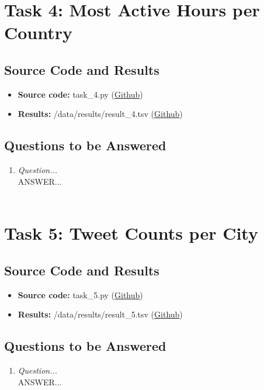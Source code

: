 \documentclass{article}
\begin{document}
\section*{Task 4: Most Active Hours per Country}
\subsection*{Source Code and Results}
    \begin{itemize}
        \item \textbf{Source code:} task\_4.py (\href{https://github.com/FredrikBakken/TDT4305_Big-Data-Project/blob/master/PhaseOne/task_4.py}{Github})
        \item \textbf{Results:} /data/results/result\_4.tsv (\href{https://github.com/FredrikBakken/TDT4305_Big-Data-Project/blob/master/PhaseOne/data/results/result_4.tsv}{Github})
    \end{itemize}

\subsection*{Questions to be Answered}
\begin{enumerate}[label=\alph*)]
    \item \textit{Question...}\\
    
    ANSWER...\\ \\
\end{enumerate}


\section*{Task 5: Tweet Counts per City}
\subsection*{Source Code and Results}
    \begin{itemize}
        \item \textbf{Source code:} task\_5.py (\href{https://github.com/FredrikBakken/TDT4305_Big-Data-Project/blob/master/PhaseOne/task_5.py}{Github})
        \item \textbf{Results:} /data/results/result\_5.tsv (\href{https://github.com/FredrikBakken/TDT4305_Big-Data-Project/blob/master/PhaseOne/data/results/result_5.tsv}{Github})
    \end{itemize}

\subsection*{Questions to be Answered}
\begin{enumerate}[label=\alph*)]
    \item \textit{Question...}\\
    
    ANSWER...\\ \\
\end{enumerate}
\end{document}
